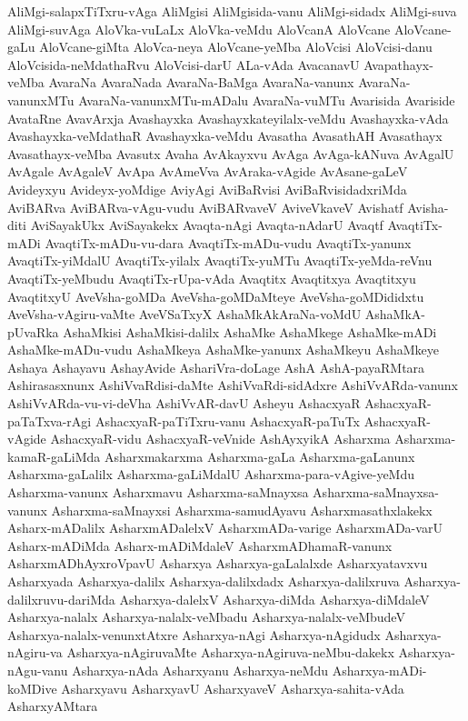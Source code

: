 {AliMgi-salapxTiTxru-vAga
AliMgisi
AliMgisida-vanu
AliMgi-sidadx
AliMgi-suva
AliMgi-suvAga
AloVka-vuLaLx
AloVka-veMdu
AloVcanA
AloVcane
AloVcane-gaLu
AloVcane-giMta
AloVca-neya
AloVcane-yeMba
AloVcisi
AloVcisi-danu
AloVcisida-neMdathaRvu
AloVcisi-darU
ALa-vAda
AvacanavU
Avapathayx-veMba
AvaraNa
AvaraNada
AvaraNa-BaMga
AvaraNa-vanunx
AvaraNa-vanunxMTu
AvaraNa-vanunxMTu-mADalu
AvaraNa-vuMTu
Avarisida
Avariside
AvataRne
AvavArxja
Avashayxka
Avashayxkateyilalx-veMdu
Avashayxka-vAda
Avashayxka-veMdathaR
Avashayxka-veMdu
Avasatha
AvasathAH
Avasathayx
Avasathayx-veMba
Avasutx
Avaha
AvAkayxvu
AvAga
AvAga-kANuva
AvAgalU
AvAgale
AvAgaleV
AvApa
AvAmeVva
AvAraka-vAgide
AvAsane-gaLeV
Avideyxyu
Avideyx-yoMdige
AviyAgi
AviBaRvisi
AviBaRvisidadxriMda
AviBARva
AviBARva-vAgu-vudu
AviBARvaveV
AviveVkaveV
Avishatf
Avisha-diti
AviSayakUkx
AviSayakekx
Avaqta-nAgi
Avaqta-nAdarU
Avaqtf
AvaqtiTx-mADi
AvaqtiTx-mADu-vu-dara
AvaqtiTx-mADu-vudu
AvaqtiTx-yanunx
AvaqtiTx-yiMdalU
AvaqtiTx-yilalx
AvaqtiTx-yuMTu
AvaqtiTx-yeMda-reVnu
AvaqtiTx-yeMbudu
AvaqtiTx-rUpa-vAda
Avaqtitx
Avaqtitxya
Avaqtitxyu
AvaqtitxyU
AveVsha-goMDa
AveVsha-goMDaMteye
AveVsha-goMDididxtu
AveVsha-vAgiru-vaMte
AveVSaTxyX
AshaMkAkAraNa-voMdU
AshaMkA-pUvaRka
AshaMkisi
AshaMkisi-dalilx
AshaMke
AshaMkege
AshaMke-mADi
AshaMke-mADu-vudu
AshaMkeya
AshaMke-yanunx
AshaMkeyu
AshaMkeye
Ashaya
Ashayavu
AshayAvide
AshariVra-doLage
AshA
AshA-payaRMtara
Ashirasasxnunx
AshiVvaRdisi-daMte
AshiVvaRdi-sidAdxre
AshiVvARda-vanunx
AshiVvARda-vu-vi-deVha
AshiVvAR-davU
Asheyu
AshacxyaR
AshacxyaR-paTaTxva-rAgi
AshacxyaR-paTiTxru-vanu
AshacxyaR-paTuTx
AshacxyaR-vAgide
AshacxyaR-vidu
AshacxyaR-veVnide
AshAyxyikA
Asharxma
Asharxma-kamaR-gaLiMda
Asharxmakarxma
Asharxma-gaLa
Asharxma-gaLanunx
Asharxma-gaLalilx
Asharxma-gaLiMdalU
Asharxma-para-vAgive-yeMdu
Asharxma-vanunx
Asharxmavu
Asharxma-saMnayxsa
Asharxma-saMnayxsa-vanunx
Asharxma-saMnayxsi
Asharxma-samudAyavu
Asharxmasathxlakekx
Asharx-mADalilx
AsharxmADalelxV
AsharxmADa-varige
AsharxmADa-varU
Asharx-mADiMda
Asharx-mADiMdaleV
AsharxmADhamaR-vanunx
AsharxmADhAyxroVpavU
Asharxya
Asharxya-gaLalalxde
Asharxyatavxvu
Asharxyada
Asharxya-dalilx
Asharxya-dalilxdadx
Asharxya-dalilxruva
Asharxya-dalilxruvu-dariMda
Asharxya-dalelxV
Asharxya-diMda
Asharxya-diMdaleV
Asharxya-nalalx
Asharxya-nalalx-veMbadu
Asharxya-nalalx-veMbudeV
Asharxya-nalalx-venunxtAtxre
Asharxya-nAgi
Asharxya-nAgidudx
Asharxya-nAgiru-va
Asharxya-nAgiruvaMte
Asharxya-nAgiruva-neMbu-dakekx
Asharxya-nAgu-vanu
Asharxya-nAda
Asharxyanu
Asharxya-neMdu
Asharxya-mADi-koMDive
Asharxyavu
AsharxyavU
AsharxyaveV
Asharxya-sahita-vAda
AsharxyAMtara
}
